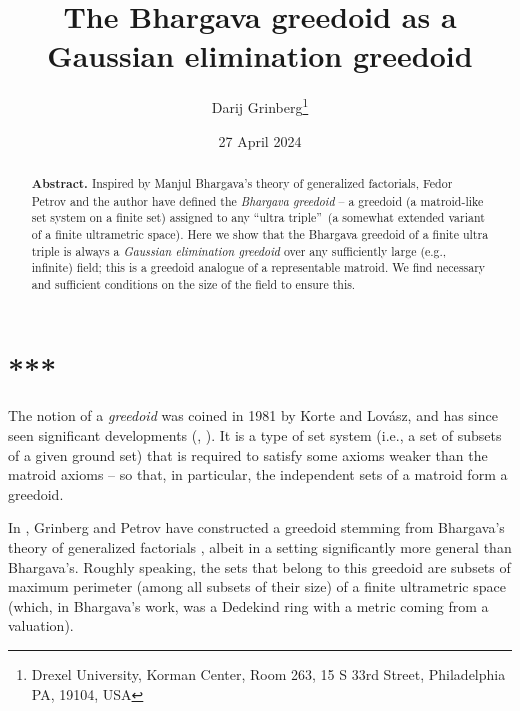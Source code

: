\documentclass[numbers=enddot,12pt,final,onecolumn,notitlepage]{scrartcl}%
\theoremstyle{definition}
\theoremstyle{plainsl}
\begin{document}
\title{The Bhargava greedoid as a Gaussian elimination greedoid}
\author{Darij Grinberg\thanks{Drexel University, Korman Center, Room 263, 15 S 33rd
Street, Philadelphia PA, 19104, USA}}
\date{27 April 2024}
\maketitle

\begin{abstract}
\textbf{Abstract.} Inspired by Manjul Bhargava's theory of generalized
factorials, Fedor Petrov and the author have defined the \textit{Bhargava
greedoid} -- a greedoid (a matroid-like set system on a finite set) assigned
to any \textquotedblleft ultra triple\textquotedblright\ (a somewhat extended
variant of a finite ultrametric space). Here we show that the Bhargava
greedoid of a finite ultra triple is always a \textit{Gaussian elimination
greedoid} over any sufficiently large (e.g., infinite) field; this is a
greedoid analogue of a representable matroid. We find necessary and sufficient
conditions on the size of the field to ensure this.

\end{abstract}
\tableofcontents

\section*{***}

The notion of a \emph{greedoid} was coined in 1981 by Korte and Lov\'{a}sz,
and has since seen significant developments (\cite{KoLoSc91}, \cite{BjoZie92}%
). It is a type of set system (i.e., a set of subsets of a given ground set)
that is required to satisfy some axioms weaker than the matroid axioms -- so
that, in particular, the independent sets of a matroid form a greedoid.

In \cite{GriPet19}, Grinberg and Petrov have constructed a greedoid stemming
from Bhargava's theory of generalized factorials \cite[\S 2]{Bharga97}, albeit
in a setting significantly more general than Bhargava's. Roughly speaking, the
sets that belong to this greedoid are subsets of maximum perimeter (among all
subsets of their size) of a finite ultrametric space (which, in Bhargava's
work, was a Dedekind ring with a metric coming from a valuation).
\end{document}
